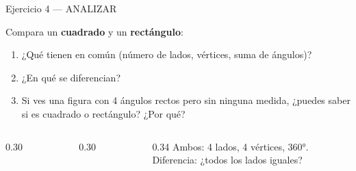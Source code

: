 \documentclass[aspectratio=169, 10pt, spanish]{beamer}
\begin{document}
\begin{frame}{Ejercicio 4 — ANALIZAR }
  \begin{analizarbox}
    Compara un \textbf{cuadrado} y un \textbf{rectángulo}:
    \begin{enumerate}
      \item ¿Qué tienen en común (número de lados, vértices,
            suma de ángulos)?
      \item ¿En qué se diferencian?
      \item Si ves una figura con 4 ángulos rectos pero sin
            ninguna medida, ¿puedes saber si es cuadrado
            o rectángulo? ¿Por qué?
    \end{enumerate}
  \end{analizarbox}
  \vspace{0.2cm}
  \begin{columns}[c]
    \begin{column}{0.30\textwidth}
      \begin{center}
      \end{center}
    \end{column}
    \begin{column}{0.30\textwidth}
      \begin{center}
      \end{center}
    \end{column}
    \begin{column}{0.34\textwidth}
      \AlmFontSmall\color{AlmAzulM}
      Ambos: 4 lados, 4 vértices, 360°. \\[4pt]
      Diferencia: ¿todos los lados iguales?
    \end{column}
  \end{columns}
\end{frame}
\end{document}
